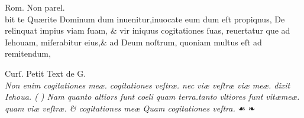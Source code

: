 \documentclass{article}
\begin{document}
{\begin{multicols}{4}
	\columnbreak

	\centering
	\tiny
	Rom. Non parel.\\
	\vspace{\baselineskip}
	\fontsize{3}{3}\selectfont
	\justifying
	\noindent bit te Qu\ae{}rite Dominum dum inuenitur,inuocate eum dum eſt propiqnus,\linebreak%
	De relinquat impius viam ſuam, \& vir iniquus cogitationes ſuas, reuertatur\linebreak%
	que ad Iehouam, miſerabitur eius,\& ad Deum noſtrum, quoniam multus eſt\linebreak%
	ad remitendum,
	\columnbreak

	\centering
	\tiny
	Curſ. Petit Text de G.\\
	\vspace{\baselineskip}
	\fontsize{4}{4.5}\selectfont
	\justifying
	\noindent \textit{Non enim cogitationes me\ae{}. cogitationes veſtr\ae{}. nec vi\ae{} veſtr\ae{} viæ \linebreak
		me\ae{}. dixit Iehoua. ( {\grecs {}\selectfont{}} ) Nam quanto altiors ſunt coeli quam\linebreak
		terra.tanto vltiores ſunt vit\ae{}me\ae{}. quam vi\ae{} veſtr\ae{}. \& cogitationes\linebreak
		me\ae{} Quam {\normalfont cogitationes} veſtra.} \quad ☙ ❧

	\columnbreak


\end{multicols}}
\end{document}
